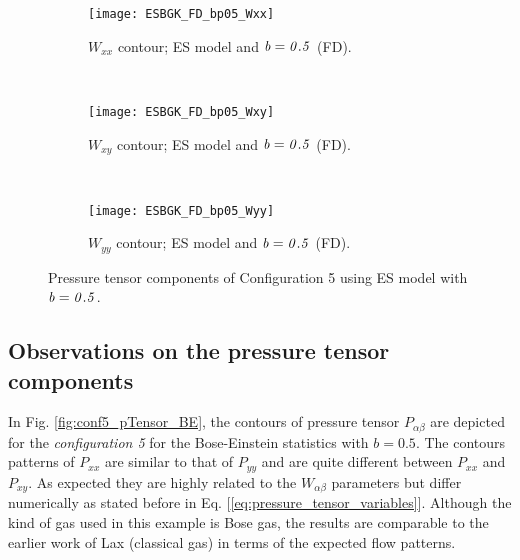\documentclass{rsproca}%
\begin{document}
\begin{figure}
\begin{subfigure}[b]{0.32\textwidth}
                \texttt{[image: ESBGK\_FD\_bp05\_Wxx]}
                \caption{$W_{xx}$ contour; ES model and $\it{b=0.5}$ (FD).}
                \label{fig:5ESBGK_FD_bp05_Wxx}
        \end{subfigure}%
        ~ %
        \begin{subfigure}[b]{0.32\textwidth}
                \centering
                \texttt{[image: ESBGK\_FD\_bp05\_Wxy]}
                \caption{$W_{xy}$ contour; ES model and $\it{b=0.5}$ (FD).}
                \label{fig:5ESBGK_FD_bp05_Wxy}
        \end{subfigure}
        ~ %
        \begin{subfigure}[b]{0.32\textwidth}
                \centering
                \texttt{[image: ESBGK\_FD\_bp05\_Wyy]}
                \caption{$W_{yy}$ contour; ES model and $\it{b=0.5}$ (FD).}
                \label{fig:5ESBGK_FD_bp05_Wyy}
        \end{subfigure}
        \caption{Pressure tensor components of Configuration 5 using ES model with $\it{b=0.5}$.}
				\label{fig:conf5_WTensor}
\end{figure}

\subsection{Observations on the pressure tensor components}
In Fig. \ref{fig:conf5_pTensor_BE}, the contours of pressure tensor $P_{\alpha \beta}$ are depicted for the \emph{configuration 5} for the Bose-Einstein statistics with $b=0.5$.  The contours patterns of $P_{xx}$ are similar to that of $P_{yy}$ and are quite different between $P_{xx}$ and $P_{xy}$. As expected they are highly related to the $W_{\alpha \beta}$ parameters but differ numerically as stated before in Eq. [\ref{eq:pressure_tensor_variables}]. Although the kind of gas used in this example is Bose gas, the results are comparable to the earlier work of Lax \cite{Laxliu95} (classical gas) in terms of the expected flow patterns.
\end{document}
